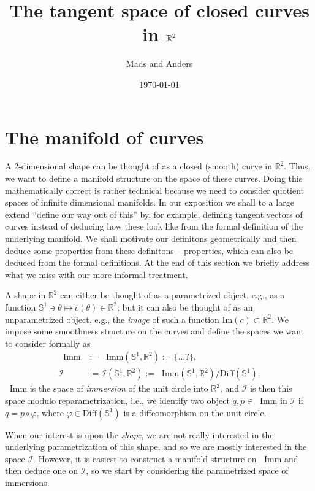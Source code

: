 \message{ !name(tangent_space_of_curves.tex)}\documentclass[a4,danish]{article}
\title{The tangent space of closed curves in $\R^2$}
\author{Mads and Anders}
\date{\today}
\theoremstyle{break}
\theoremstyle{definition}
\theoremstyle{Break}
\newcommand{\R}{\mathbb{R}}
\newcommand*\I{\mathop{}\!\mathrm{Imm}}
\renewcommand{\S}{\mathbb{S}}
\renewcommand{\phi}{\varphi}
\begin{document}



\section{The manifold of curves}
\label{sec:manifold-curves}

A 2-dimensional shape can be thought of as a closed (smooth) curve in $\R^2$. Thus, we want to define a manifold structure on the space of these curves. Doing this mathematically correct is rather technical because we need to consider quotient spaces of infinite dimensional manifolds. In our exposition we shall to a large extend ``define our way out of this'' by, for example, defining tangent vectors of curves instead of deducing how these look like from the formal definition of the underlying manifold. We shall motivate our definitons geometrically and then deduce some properties from these definitons -- properties, which can also be deduced from the formal definitions. At the end of this section we briefly address what we miss with our more informal treatment.

A shape in $\R^2$ can either be thought of as a parametrized object, e.g., as a function $\S^1 \ni \theta \mapsto c(\theta) \in \R^2$; but it can also be thought of as an unparametrized object, e.g., the \textit{image} of such a function $\text{Im}(c) \subset \R^2$. We impose some smoothness structure on the curves and define the spaces we want to consider formally as
\begin{equation*}
  \begin{aligned}
    \I & := \I(\S^1, \R^2)  :=  \{ ...? \}, \\
    \mathcal{I} & := \mathcal{I}(\S^1, \R^2)  := \I(\S^1, \R^2)/\mathrm{Diff}(\S^1).
  \end{aligned}
\end{equation*}
$\I$ is the space of \textit{immersion} of the unit circle into $\R^2$, and $\mathcal{I}$ is then this space modulo reparametrization, i.e., we identify two object $q,p \in \I$ in $\mathcal{I}$ if $q=p \circ \phi$, where $\phi \in \mathrm{Diff}(\S^1)$ is a diffeomorphism on the unit circle.

When our interest is upon the \textit{shape}, we are not really interested in the underlying parametrization of this shape, and so we are mostly interested in the space $\mathcal{I}$. However, it is easiest to construct a manifold structure on $\I$ and then deduce one on $\mathcal{I}$, so we start by considering the parametrized space of immersions. 
\end{document}
